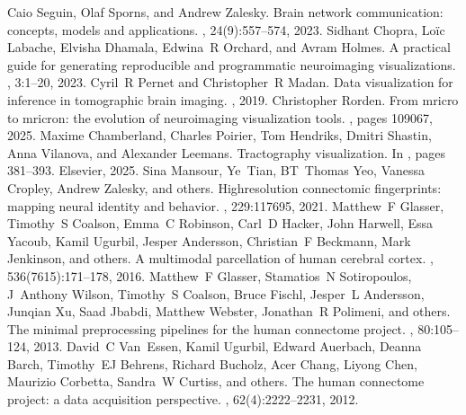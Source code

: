 \documentclass[letterpaper,10pt,english]{jupyterBook}
\begin{document}
\begin{sphinxthebibliography}{10}
\sphinxAtStartPar
Caio Seguin, Olaf Sporns, and Andrew Zalesky. Brain network communication: concepts, models and applications. , 24(9):557–574, 2023.
\sphinxAtStartPar
Sidhant Chopra, Loïc Labache, Elvisha Dhamala, Edwina R Orchard, and Avram Holmes. A practical guide for generating reproducible and programmatic neuroimaging visualizations. , 3:1–20, 2023.
\sphinxAtStartPar
Cyril R Pernet and Christopher R Madan. Data visualization for inference in tomographic brain imaging. , 2019.
\sphinxAtStartPar
Christopher Rorden. From mricro to mricron: the evolution of neuroimaging visualization tools. , pages 109067, 2025.
\sphinxAtStartPar
Maxime Chamberland, Charles Poirier, Tom Hendriks, Dmitri Shastin, Anna Vilanova, and Alexander Leemans. Tractography visualization. In , pages 381–393. Elsevier, 2025.
\sphinxAtStartPar
Sina Mansour, Ye Tian, BT Thomas Yeo, Vanessa Cropley, Andrew Zalesky, and others. High\sphinxhyphen{}resolution connectomic fingerprints: mapping neural identity and behavior. , 229:117695, 2021.
\sphinxAtStartPar
Matthew F Glasser, Timothy S Coalson, Emma C Robinson, Carl D Hacker, John Harwell, Essa Yacoub, Kamil Ugurbil, Jesper Andersson, Christian F Beckmann, Mark Jenkinson, and others. A multi\sphinxhyphen{}modal parcellation of human cerebral cortex. , 536(7615):171–178, 2016.
\sphinxAtStartPar
Matthew F Glasser, Stamatios N Sotiropoulos, J Anthony Wilson, Timothy S Coalson, Bruce Fischl, Jesper L Andersson, Junqian Xu, Saad Jbabdi, Matthew Webster, Jonathan R Polimeni, and others. The minimal preprocessing pipelines for the human connectome project. , 80:105–124, 2013.
\sphinxAtStartPar
David C Van Essen, Kamil Ugurbil, Edward Auerbach, Deanna Barch, Timothy EJ Behrens, Richard Bucholz, Acer Chang, Liyong Chen, Maurizio Corbetta, Sandra W Curtiss, and others. The human connectome project: a data acquisition perspective. , 62(4):2222–2231, 2012.

\end{sphinxthebibliography}
\end{document}
